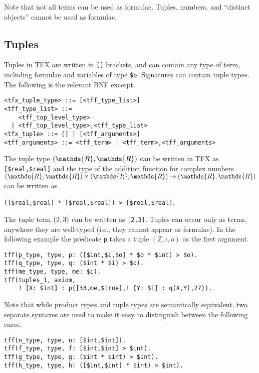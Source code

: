 Note that not all terms can be used as formulae.
Tuples, numbers, and ``distinct objects'' cannot be used as formulae.

\subsection{Tuples}

Tuples in TFX are written in {\tt []} brackets, and can contain any type of 
term, including formulae and variables of type \lstinline'$o'. 
Signatures can contain tuple types. 
The following is the relevant BNF excerpt.
\begin{lstlisting}[language=bnf]
<tfx_tuple_type> ::= [<tff_type_list>]
<tff_type_list> ::=
    <tff_top_level_type>
  | <tff_top_level_type>,<tff_type_list>
<tfx_tuple> ::= [] | [<tff_arguments>]
<tff_arguments> ::= <tff_term> | <tff_term>,<tff_arguments>
\end{lstlisting}

The tuple type $\tuple{\mathds{R},\mathds{R}}$ can be written in TFX 
as \lstinline|[$real,$real]| and the type of the addition function for 
complex numbers $\tuple{\mathds{R},\mathds{R}} \times 
\tuple{\mathds{R},\mathds{R}} \to \tuple{\mathds{R},\mathds{R}}$ can be 
written as \begin{center}\lstinline'([$real,$real] * [$real,$real]) > [$real,$real]'.\end{center}
The tuple term $({2,3})$ can be written as \lstinline'[2,3]'.
Tuples can occur only as terms, anywhere they are well-typed (i.e., they
cannot appear as formulae). In the following example the predicate \lstinline|p|
takes a tuple $(\mathds{Z},\iota,o)$ as the first argument.
\begin{lstlisting}[language=tptp]
tff(p_type, type, p: ([$int,$i,$o] * $o * $int) > $o).
tff(q_type, type, q: ($int * $i) > $o).
tff(me_type, type, me: $i).
tff(tuples_1, axiom,
    ! [X: $int] : p([33,me,$true],! [Y: $i] : q(X,Y),27)).
\end{lstlisting}

Note that while product types and tuple types are semantically equivalent,
two separate syntaxes are used to make it easy to distinguish 
between the following cases.
\begin{lstlisting}[language=tptp]
tff(n_type, type, n: [$int,$int]).
tff(f_type, type, f: [$int,$int] > $int).
tff(g_type, type, g: ($int * $int) > $int).
tff(h_type, type, h: ([$int,$int] * $int) > $int).
\end{lstlisting}

